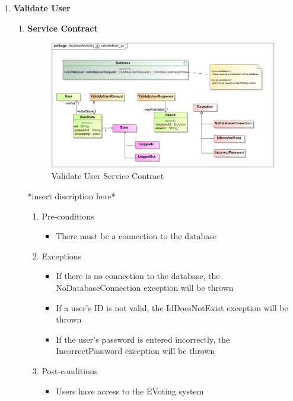 \begin{enumerate}
	\item \textbf{Validate User}
		\begin{enumerate}
			\item \textbf{Service Contract}
				\begin{figure}[H]
					\centering
					\includegraphics[width=0.75\linewidth]{../Images/Database/ServiceContracts/ValidateUser_ServiceContract.png}
					\caption{Validate User Service Contract}
				\end{figure}
				
				*insert discription here*
				\newline				
				
				\begin{enumerate}
					\item Pre-conditions
					\begin{itemize}
						\item There must be a connection to the database
					\end{itemize}
					
					\item Exceptions
					\begin{itemize}
						\item If there is no connection to the database, the NoDatabaseConnection exception will be thrown
						\item If a user's ID is not valid, the IdDoesNotExist exception will be thrown
						\item If the user's password is entered incorrectly, the IncorrectPassword exception will be thrown
					\end{itemize}
					
					\item Post-conditions
					\begin{itemize}
						\item Users have access to the EVoting system
					\end{itemize}
				\end{enumerate}
			

\end{enumerate}
\end{enumerate}
